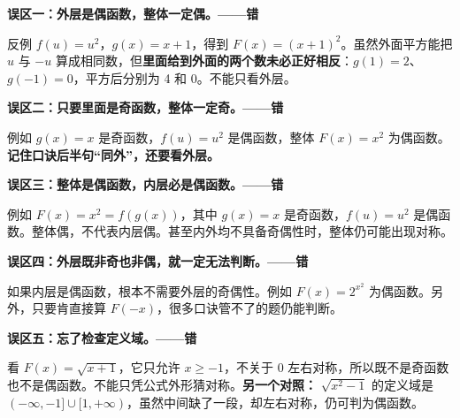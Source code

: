 \clearpage
\begin{trapbox}
\textbf{\textcolor{CTrap}{误区一：外层是偶函数，整体一定偶。——错}}


反例 $f(u)=u^2$，$g(x)=x+1$，得到 $F(x)=(x+1)^2$。虽然外面平方能把 $u$ 与 $-u$ 算成相同数，但\textbf{里面给到外面的两个数未必正好相反}：$g(1)=2$、$g(-1)=0$，平方后分别为 4 和 0。不能只看外层。

\medskip

\end{trapbox}
\clearpage
\begin{trapbox}
\textbf{\textcolor{CTrap}{误区二：只要里面是奇函数，整体一定奇。——错}}


例如 $g(x)=x$ 是奇函数，$f(u)=u^2$ 是偶函数，整体 $F(x)=x^2$ 为偶函数。\textbf{记住口诀后半句“同外”，还要看外层。}

\medskip

\end{trapbox}
\clearpage
\begin{trapbox}
\textbf{\textcolor{CTrap}{误区三：整体是偶函数，内层必是偶函数。——错}}


例如 $F(x)=x^2=f(g(x))$，其中 $g(x)=x$ 是奇函数，$f(u)=u^2$ 是偶函数。整体偶，不代表内层偶。甚至内外均不具备奇偶性时，整体仍可能出现对称。

\medskip

\end{trapbox}
\clearpage
\begin{trapbox}
\textbf{\textcolor{CTrap}{误区四：外层既非奇也非偶，就一定无法判断。——错}}


如果内层是偶函数，根本不需要外层的奇偶性。例如 $F(x)=2^{x^2}$ 为偶函数。另外，只要肯直接算 $F(-x)$，很多口诀管不了的题仍能判断。

\medskip

\end{trapbox}
\clearpage
\begin{trapbox}
\textbf{\textcolor{CTrap}{误区五：忘了检查定义域。——错}}


看 $F(x)=\sqrt{x+1}$，它只允许 $x\geqslant-1$，不关于 $0$ 左右对称，所以既不是奇函数也不是偶函数。不能只凭公式外形猜对称。\textbf{另一个对照：} $\sqrt{x^2-1}$ 的定义域是 $(-\infty,-1]\cup[1,+\infty)$，虽然中间缺了一段，却左右对称，仍可判为偶函数。

\medskip

\end{trapbox}
